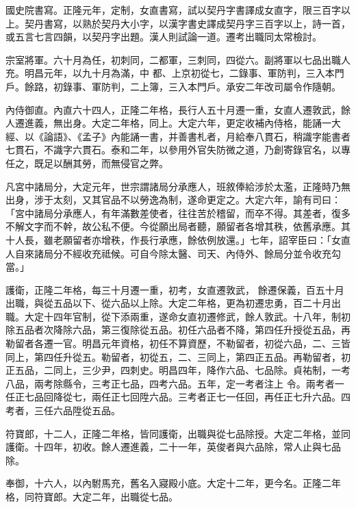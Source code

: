 \begin{pinyinscope}
 國史院書寫。正隆元年，定制，女直書寫，試以契丹字書譯成女直字，限三百字以上。契丹書寫，以熟於契丹大小字，以漢字書史譯成契丹字三百字以上，詩一首，或五言七言四韻，以契丹字出題。漢人則試論一道。遷考出職同太常檢討。



 宗室將軍。六十月為任，初刺同，二都軍，三刺同，四從六。副將軍以七品出職人充。明昌元年，以九十月為滿，中
 都、上京初從七，二錄事、軍防判，三入本門戶。餘路，初錄事、軍防判，二上簿，三入本門戶。承安二年改司屬令作隨朝。



 內侍御直。內直六十四人，正隆二年格，長行人五十月遷一重，女直人遷敦武，餘人遷進義，無出身。大定二年格，同上。大定六年，更定收補內侍格，能誦一大經、以《論語》、《孟子》內能誦一書，并善書札者，月給奉八貫石，稍識字能書者七貫石，不識字六貫石。泰和二年，以參用外官失防微之道，乃創寄錄官名，以專任之，既足以酬其勞，而無侵官之弊。



 凡宮中諸局分，大定元年，世宗謂諸局分承應人，班敘俸給涉於太濫，正隆時乃無出身，涉于太刻，又其官品不以勞逸為制，遂命更定之。大定六年，諭有司曰：「宮中諸局分承應人，有年滿數差使者，往往苦於稽留，而卒不得。其差者，復多不解文字而不幹，故公私不便。今從願出局者聽，願留者各增其秩，依舊承應。其十人長，雖老願留者亦增秩，作長行承應，餘依例放還。」七年，詔宰臣曰：「女直人自來諸局分不經收充祗候。可自今除太醫、司天、內侍外、餘局分並令收充勾當。」



 護衛，正隆二年格，每三十月遷一重，初考，女直遷敦武，
 餘遷保義，百五十月出職，與從五品以下、從六品以上除。大定二年格，更為初遷忠勇，百二十月出職。大定十四年官制，從下添兩重，遂命女直初遷修武，餘人敦武。十八年，制初除五品者次降除六品，第三復除從五品。初任六品者不降，第四任升授從五品，再勒留者各遷一官。明昌元年資格，初任不算資歷，不勒留者，初從六品，二、三皆同上，第四任升從五。勒留者，初從五，二、三同上，第四正五品。再勒留者，初正五品，二同上，三少尹，四刺史。明昌四年，降作六品、七品除。貞祐制，一考八品，兩考除縣令，三考正七品，四考六品。五年，定一考者注上
 令。兩考者一任正七品回降從七，兩任正七回陞六品。三考者正七一任回，再任正七升六品。四考者，三任六品陞從五品。



 符寶郎，十二人，正隆二年格，皆同護衛，出職與從七品除授。大定二年格，並同護衛。十四年，初收。餘人遷進義，二十一年，英俊者與六品除，常人止與七品除。



 奉御，十六人，以內駙馬充，舊名入寢殿小底。大定十二年，更今名。正隆二年格，同符寶郎。大定二年，出職從七品。




\end{pinyinscope}
